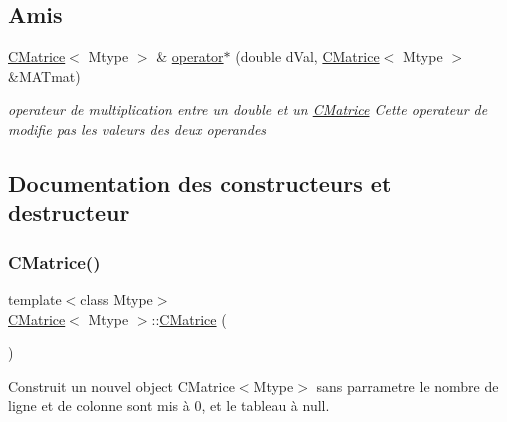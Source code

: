 \subsection*{Amis}
\begin{DoxyCompactItemize}
\item 
\hyperlink{classCMatrice}{C\+Matrice}$<$ Mtype $>$ \& \hyperlink{classCMatrice_a33685213ef22f3fd4cb0d783a2c555c3}{operator$\ast$} (double d\+Val, \hyperlink{classCMatrice}{C\+Matrice}$<$ Mtype $>$ \&M\+A\+Tmat)
\begin{DoxyCompactList}\small\item\em operateur de multiplication entre un double et un \hyperlink{classCMatrice}{C\+Matrice} Cette operateur de modifie pas les valeurs des deux operandes \end{DoxyCompactList}\end{DoxyCompactItemize}


\subsection{Documentation des constructeurs et destructeur}
\mbox{\label{classCMatrice_a5d0995a09020ec499057c486f505fb2b}} 
\subsubsection{\texorpdfstring{C\+Matrice()}{CMatrice()}\hspace{0.1cm}{\footnotesize\ttfamily [1/3]}}
{\footnotesize\ttfamily template$<$class Mtype$>$ \\
\hyperlink{classCMatrice}{C\+Matrice}$<$ Mtype $>$\+::\hyperlink{classCMatrice}{C\+Matrice} (\begin{DoxyParamCaption}{ }\end{DoxyParamCaption})\hspace{0.3cm}{\ttfamily [inline]}}



Construit un nouvel object C\+Matrice$<$\+Mtype$>$ sans parrametre le nombre de ligne et de colonne sont mis à 0, et le tableau à null. 

\mbox{\label{classCMatrice_ae9e91dd3270e72d4d5787f4ae789a740}} 
